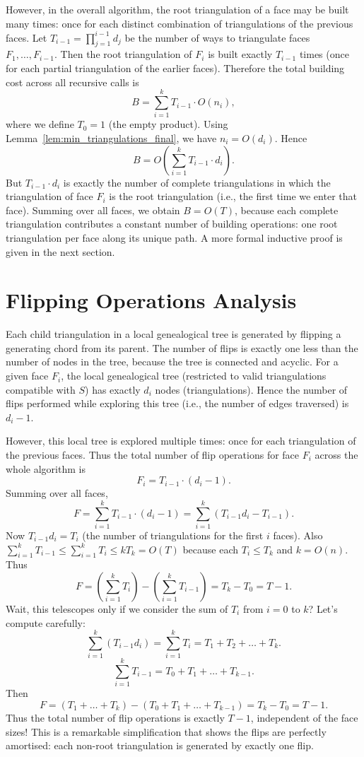 However, in the overall algorithm, the root triangulation of a face may be built many times: once for each distinct combination of triangulations of the previous faces. 
Let \(T_{i-1} = \prod_{j=1}^{i-1} d_j\) be the number of ways to triangulate faces \(F_1, \dots, F_{i-1}\). 
Then the root triangulation of \(F_i\) is built exactly \(T_{i-1}\) times (once for each partial triangulation of the earlier faces). 
Therefore the total building cost across all recursive calls is
\[
    B = \sum_{i=1}^{k} T_{i-1} \cdot O(n_i),
\]
where we define \(T_0 = 1\) (the empty product). 
Using Lemma~\ref{lem:min_triangulations_final}, we have \(n_i = O(d_i)\). 
Hence
\[
    B = O\left( \sum_{i=1}^{k} T_{i-1} \cdot d_i \right).
\]
But \(T_{i-1} \cdot d_i\) is exactly the number of complete triangulations in which the triangulation of face \(F_i\) is the root triangulation (i.e., the first time we enter that face). 
Summing over all faces, we obtain \(B = O(T)\), because each complete triangulation contributes a constant number of building operations: one root triangulation per face along its unique path. 
A more formal inductive proof is given in the next section.

\section{Flipping Operations Analysis}
\label{sec:flipping_ops}

Each child triangulation in a local genealogical tree is generated by flipping a generating chord from its parent. 
The number of flips is exactly one less than the number of nodes in the tree, because the tree is connected and acyclic. 
For a given face \(F_i\), the local genealogical tree (restricted to valid triangulations compatible with \(S\)) has exactly \(d_i\) nodes (triangulations). 
Hence the number of flips performed while exploring this tree (i.e., the number of edges traversed) is \(d_i - 1\).

However, this local tree is explored multiple times: once for each triangulation of the previous faces. 
Thus the total number of flip operations for face \(F_i\) across the whole algorithm is
\[
    F_i = T_{i-1} \cdot (d_i - 1).
\]
Summing over all faces,
\[
    F = \sum_{i=1}^{k} T_{i-1} \cdot (d_i - 1) = \sum_{i=1}^{k} (T_{i-1} d_i - T_{i-1}).
\]
Now \(T_{i-1} d_i = T_i\) (the number of triangulations for the first \(i\) faces). 
Also \(\sum_{i=1}^{k} T_{i-1} \le \sum_{i=1}^{k} T_i \le k T_k = O(T)\) because each \(T_i \le T_k\) and \(k = O(n)\). 
Thus
\[
    F = \left( \sum_{i=1}^{k} T_i \right) - \left( \sum_{i=1}^{k} T_{i-1} \right) = T_k - T_0 = T - 1.
\]
Wait, this telescopes only if we consider the sum of \(T_i\) from \(i=0\) to \(k\)? Let's compute carefully:
\[
\sum_{i=1}^{k} (T_{i-1} d_i) = \sum_{i=1}^{k} T_i = T_1 + T_2 + \dots + T_k.
\]
\[
\sum_{i=1}^{k} T_{i-1} = T_0 + T_1 + \dots + T_{k-1}.
\]
Then
\[
F = (T_1 + \dots + T_k) - (T_0 + T_1 + \dots + T_{k-1}) = T_k - T_0 = T - 1.
\]
Thus the total number of flip operations is exactly \(T - 1\), independent of the face sizes! 
This is a remarkable simplification that shows the flips are perfectly amortised: each non-root triangulation is generated by exactly one flip.

